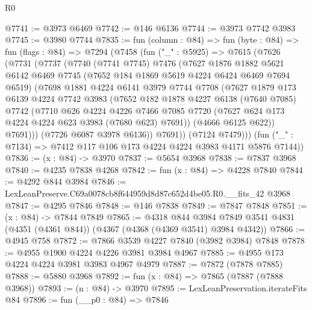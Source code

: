 \begin{lexlean}{R0}
\begin{coremodule}
@7741 := @3973 @6469
@7742 := @146 @6136
@7744 := @3973 @7742 @3983
@7745 := @3980 @7744
@7835 := fun (column : @84) =>
  fun (byte : @84) =>
  fun (flags : @84) =>
  @7294
    (@7458
      (fun ("_" : @5925) =>
      @7615
        (@7626
          (@7731
            (@7737
              (@7740
                (@7741 @7745)
                @7476
                (@7627
                  @1876
                  @1882
                  @5621
                  @6142
                  @6469
                  @7745
                  (@7652 @184 @1869 @5619 @4224 @6424 @6469 @7694 @6519)
                  (@7698
                    @1881
                    @4224
                    @6141
                    @3979
                    @7744
                    @7708
                    (@7627
                      @1879
                      @173
                      @6139
                      @4224
                      @7742
                      @3983
                      (@7652
                        @182
                        @1878
                        @4227
                        @6138
                        (@7640 @7085)
                        @7742
                        (@7710
                          @626
                          @4224
                          @4226
                          @7466
                          @7085
                          @7720
                          (@7627 @624 @173 @4224 @4224 @623 @3983 (@7680 @623) @7691))
                        (@4666 @6125 @622))
                      @7691)))
                (@7726 @6087 @3978 @6136))
              @7691))
          (@7124 @7479)))
      (fun ("_" : @7134) => @7412 @117 @106 @173 @4224 @4224 @3983 @4171 @5876 @7144))
@7836 := (x : @84) -> @3970
@7837 := @5654 @3968
@7838 := @7837 @3968
@7840 := @4235 @7838 @4268
@7842 := fun (x : @84) => @4228 @7840
@7844 := @4292 @844 @3984
@7846 := LexLeanPreserve.C69a0078cb8f644959d8d87c652d4be05.R0.__fits_42 @3968
@7847 := @4295 @7846
@7848 := @146 @7838
@7849 := @7847 @7848
@7851 := (x : @84) -> @7844 @7849
@7865 := @4318
    @844
    @3984
    @7849
    @3541
    @4831
    (@4351 (@4361 @844))
    (@4367 (@4368 (@4369 @3541) @3984 @4342))
@7866 := @4945 @758
@7872 := @7866 @3539 @4227 @7840 (@3982 @3984) @7848
@7878 := @4955 @1900 @4224 @4226 @3981 @3984 @4967
@7885 := @4955 @173 @4224 @4224 @3981 @3983 @4967 @4979
@7887 := @7872 (@7878 @7885)
@7888 := @5880 @3968
@7892 := fun (x : @84) => @7865 (@7887 (@7888 @3968))
@7893 := (n : @84) -> @3970
@7895 := LexLeanPreservation.iterateFits @84
@7896 := fun (__p0 : @84) => @7846

\end{coremodule}
\end{lexlean}

